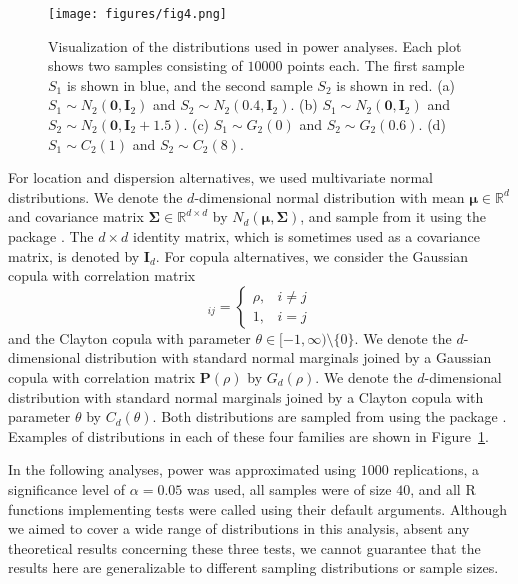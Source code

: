 \begin{figure}[htbp]
\centering
\texttt{[image: figures/fig4.png]}
\caption{Visualization of the distributions used in power analyses. Each plot shows two samples consisting of $10000$ points each. The first sample $S_{1}$ is shown in blue, and the second sample $S_{2}$ is shown in red. (a) $S_{1}\sim N_{2}(\mathbf{0},\mathbf{I}_{2})$ and $S_{2}\sim N_{2}(\mathbf{0.4},\mathbf{I}_{2})$. (b) $S_{1}\sim N_{2}(\mathbf{0},\mathbf{I}_{2})$ and $S_{2}\sim N_{2}(\mathbf{0},\mathbf{I}_{2}+1.5)$. (c) $S_{1}\sim G_{2}(0)$ and $S_{2}\sim G_{2}(0.6)$. (d) $S_{1}\sim C_{2}(1)$ and $S_{2}\sim C_{2}(8)$.}
\label{figure:power_dist}
\end{figure}

For location and dispersion alternatives, we used multivariate normal distributions. We denote the $d$-dimensional normal distribution with mean $\boldsymbol\mu\in\mathbb{R}^{d}$ and covariance matrix $\boldsymbol\Sigma\in\mathbb{R}^{d\times d}$ by $N_{d}(\boldsymbol\mu,\boldsymbol\Sigma)$, and sample from it using the  package \citep{mass}. The $d\times d$ identity matrix, which is sometimes used as a covariance matrix, is denoted by $\mathbf{I}_{d}$. For copula alternatives, we consider the Gaussian copula with correlation matrix
\begin{equation*}
[\mathbf{P}(\rho)]_{ij}=\begin{cases}
\rho,&i\neq j\\
1,&i=j
\end{cases}
\end{equation*}
and the Clayton copula with parameter $\theta\in[-1,\infty)\setminus\{0\}$. We denote the $d$-dimensional distribution with standard normal marginals joined by a Gaussian copula with correlation matrix $\mathbf{P}(\rho)$ by $G_{d}(\rho)$. We denote the $d$-dimensional distribution with standard normal marginals joined by a Clayton copula with parameter $\theta$ by $C_{d}(\theta)$. Both distributions are sampled from using the  package \citep{copulaR}. Examples of distributions in each of these four families are shown in Figure~\ref{figure:power_dist}.

In the following analyses, power was approximated using $1000$ replications, a significance level of $\alpha=0.05$ was used, all samples were of size $40$, and all R functions implementing tests were called using their default arguments. Although we aimed to cover a wide range of distributions in this analysis, absent any theoretical results concerning these three tests, we cannot guarantee that the results here are generalizable to different sampling distributions or sample sizes.

